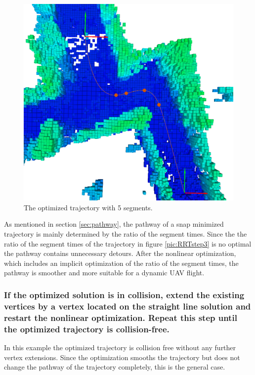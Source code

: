 \begin{figure}[h]
   \centering
   \includegraphics[trim = 45mm 0mm 35mm 0mm, clip,width=1\textwidth]{pics/extensionCLongP.png}
   \caption{The optimized trajectory with 5 segments.}
\label{pic:RRTstep4}
\end{figure}

As mentioned in section \ref{sec:pathway}, the pathway of a snap minimized trajectory is mainly determined by the ratio of the segment times. Since the the ratio of the segment times of the trajectory in figure \ref{pic:RRTstep3} is no optimal the pathway contains unnecessary detours. After the nonlinear optimization, which includes an implicit optimization of the ratio of the segment times, the pathway is smoother and more suitable for a dynamic UAV flight.

\subsubsection{If the optimized solution is in collision, extend the existing vertices by a vertex located on the straight line solution and restart the nonlinear optimization. Repeat this step until the optimized trajectory is collision-free.}
In this example the optimized trajectory is collision free without any further vertex extensions. Since the optimization smooths the trajectory but does not change the pathway of the trajectory completely, this is the general case. \newline

